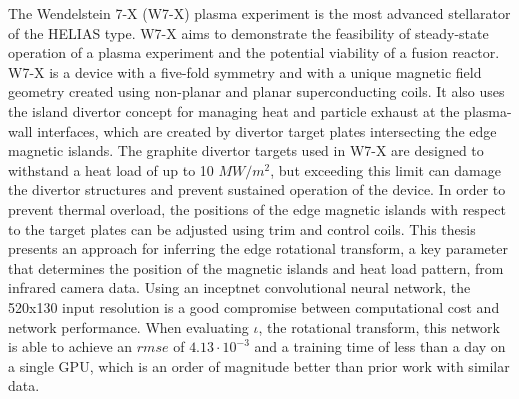 %
\label{sec:abstract}

The Wendelstein 7-X (W7-X) plasma experiment is the most advanced stellarator of the HELIAS type. W7-X aims to demonstrate the feasibility of steady-state operation of a plasma experiment and the potential viability of a fusion reactor. W7-X is a device with a five-fold symmetry and with a unique magnetic field geometry created using non-planar and planar superconducting coils. It also uses the island divertor concept for managing heat and particle exhaust at the plasma-wall interfaces, which are created by divertor target plates intersecting the edge magnetic islands. The graphite divertor targets used in W7-X are designed to withstand a heat load of up to 10 $MW/m^2$, but exceeding this limit can damage the divertor structures and prevent sustained operation of the device. In order to prevent thermal overload, the positions of the edge magnetic islands with respect to the target plates can be adjusted using trim and control coils. This thesis presents an approach for inferring the edge rotational transform, a key parameter that determines the position of the magnetic islands and heat load pattern, from infrared camera data. Using an inceptnet convolutional neural network, the 520x130 input resolution is a good compromise between computational cost and network performance. When evaluating $\iota$, the rotational transform, this network is able to achieve an $rmse$ of $4.13 \cdot 10^{-3}$ and a training time of less than a day on a single GPU, which is an order of magnitude better than prior work with similar data.